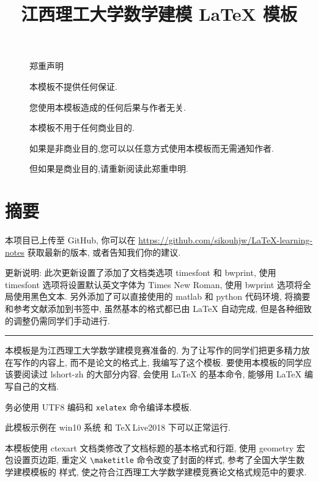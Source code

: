 \documentclass[timesfont,no-math]{JXUSTmodeling}%
\title{江西理工大学数学建模 \LaTeX{} 模板}%
\begin{document}
	\maketitle%

	\newpage
	\begin{figure}[!ht]
		\centering
		\heiti{} {\color{red}郑重声明}
		
		本模板不提供任何保证. 
		
		您使用本模板造成的任何后果与作者无关.
		
		本模板不用于任何商业目的.
		
		如果是非商业目的,您可以以任意方式使用本模板而无需通知作者.
		
		但如果是商业目的,请{\color{red}重新阅读}此郑重申明.
	\end{figure}
\thispagestyle{empty}
	
	
	\newpage
	\section*{摘\hspace{2em}要}%
	{ 本项目已上传至 GitHub, 你可以在 \url{https://github.com/sikouhjw/LaTeX-learning-notes} 获取最新的版本, 或者告知我们你的建议.}
	
	\vspace{1em}
	
	更新说明: 此次更新设置了添加了文档类选项 timesfont 和 bwprint, 使用 timesfont 选项将设置默认英文字体为 Times New Roman, 使用 
	 bwprint 选项将全局使用黑色文本. 另外添加了可以直接使用的 matlab 和 python 代码环境, 将摘要和参考文献添加到书签中, 
	虽然基本的格式都已由 \LaTeX{} 自动完成, 但是各种细致的调整仍需同学们手动进行.
	
	\noindent\rule{\textwidth}{1pt}

	本模板是为江西理工大学数学建模竞赛准备的. 为了让写作的同学们把更多精力放在写作的内容上, 
	而不是论文的格式上, 我编写了这个模板. 要使用本模板的同学应该要阅读过 lshort-zh \cite{lshort-zh} 的大部分内容,
	会使用 \LaTeX{} 的基本命令, 能够用 \LaTeX{} 编写自己的文档.
	
	务必使用 UTF8 编码和 \texttt{xelatex} 命令编译本模板.
	
	此模板示例在 win10 系统 和 \TeX\,Live2018 下可以正常运行.
	
	本模板使用 ctexart 文档类\cite{ctex-package}修改了文档标题的基本格式和行距, 使用 geometry 宏包设置页边距, 
	重定义 \verb|\maketitle|\cite{classes} 命令改变了封面的样式, 参考了全国大学生数学建模模板\cite{CUMCMThesis}的
	样式, 使之符合江西理工大学数学建模竞赛论文格式规范中的要求.
	
\end{document}
